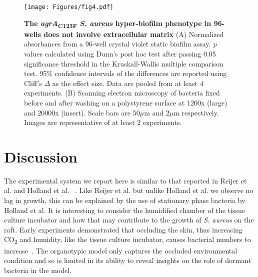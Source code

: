 \documentclass[10pt,letterpaper]{article}
\begin{document}
\begin{figure}[!ht]
\begin{adjustwidth}{-2.25in}{0in}
\texttt{[image: Figures/fig4.pdf]}
\caption[The \textit{agrA}\textsubscript{C123F} \textit{S. aureus} hyper-biofilm phenotype in 96-wells does not involve extracellular matrix]{
	\textbf{The \textit{agrA}\textsubscript{C123F} \textit{S. aureus} hyper-biofilm phenotype in 96-wells does not involve extracellular matrix}
	(A) Normalized absorbances from a 96-well crystal violet static biofilm assay. \textit{p} values calculated using Dunn's post hoc test after passing 0.05 significance threshold in the Kruskall-Wallis multiple comparison test. 95\% confidence intervals of the differences are reported using Cliff's $\Delta$ as the effect size. Data are pooled from at least 4 experiments.
	(B) Scanning electron microscopy of bacteria fixed before and after washing on a polystyrene surface at 1200x (large) and 20000x (insert). Scale bars are 50$\mu$m and 2$\mu$m respectively. Images are representative of at least 2 experiments.}
    \label{fig4}
    \end{adjustwidth}
\end{figure}

\section*{Discussion}

The experimental system we report here is similar to that reported in Reijer et al. and Holland et al. ~\cite{reijer_detection_2016,holland_microbial_2008}.
Like Reijer et al. but unlike Holland et al. we observe no lag in growth, this can be explained by the use of stationary phase bacteria by Holland et al.
It is interesting to consider the humidified chamber of the tissue culture incubator and how that may contribute to the growth of \textit{S. aureus} on the raft.
Early experiments demonstrated that occluding the skin, thus increasing CO\textsubscript{2} and humidity, like the tissue culture incubator, causes bacterial numbers to increase~\cite{lovell_skin_1945-1}.
The organotypic model only captures the occluded environmental condition and so is limited in its ability to reveal insights on the role of dormant bacteria in the model.
\end{document}
